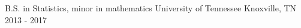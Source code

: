 \begin{cventries}
  \cventry
    {B.S. in Statistics, minor in mathematics}
    {University of Tennessee}
    {Knoxville, TN}
    {2013 - 2017}
    {}
\end{cventries}
